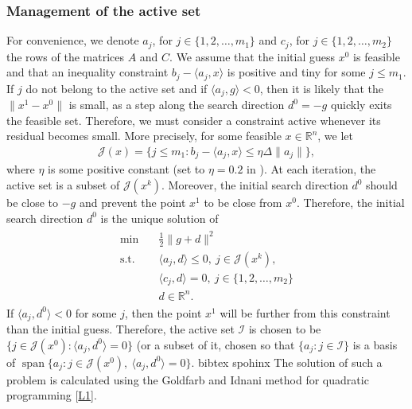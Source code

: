 \documentclass[letterpaper,10pt,english]{sphinxmanual}
\DeclareMathOperator{\vspan}{span}
\newcommand{\norm}[2][]{#1\lVert#2#1\rVert}
\newcommand{\set}[2][]{#1\{#2#1\}}
\newcommand{\inner}[2][]{#1\langle#2#1\rangle}
\def\R{\ensuremath{\mathds{R}}}
\begin{document}
\subsubsection{Management of the active set}
\label{\detokenize{algo/linalg.lctcg:management-of-the-active-set}}
\sphinxAtStartPar
For convenience, we denote
\(a_j\), for \(j \in \set{1, 2, \dots, m_1}\) and
\(c_j\), for \(j \in \set{1, 2, \dots, m_2}\) the rows of the matrices
\(A\) and \(C\). We assume that the initial guess \(x^0\) is
feasible and that an inequality constraint \(b_j - \inner{a_j, x}\) is
positive and tiny for some \(j \le m_1\). If \(j\) do not belong to the
active set and if \(\inner{a_j, g} < 0\), then it is likely that the
\(\norm{x^1 - x^0}\) is small, as a step along the search direction
\(d^0 = -g\) quickly exits the feasible set. Therefore, we must consider a
constraint active whenever its residual becomes small. More precisely, for some
feasible \(x \in \R^n\), we let
\begin{equation*}
\begin{split}\mathcal{J}(x) = \set[\big]{j \le m_1 : b_j - \inner{a_j, x} \le \eta \Delta \norm{a_j}},\end{split}
\end{equation*}
\sphinxAtStartPar
where \(\eta\) is some positive constant
(set to \(\eta = 0.2\) in ). At each iteration, the active set is a
subset of \(\mathcal{J}(x^k)\). Moreover, the initial search direction
\(d^0\) should be close to \(-g\) and prevent the point \(x^1\) to
be close from \(x^0\). Therefore, the initial search direction \(d^0\)
is the unique solution of
\begin{equation*}
\begin{split}\begin{array}{ll}
    \min        & \quad \frac{1}{2} \norm{g + d}^2\\
    \text{s.t.} & \quad \inner{a_j, d} \le 0, ~ j \in \mathcal{J}(x^k),\\
                & \quad \inner{c_j, d} = 0, ~ j \in \set{1, 2, \dots, m_2}\\
                & \quad d \in \R^n.
\end{array}\end{split}
\end{equation*}
\sphinxAtStartPar
If \(\inner{a_j, d^0} < 0\) for some \(j\), then the point \(x^1\)
will be further from this constraint than the initial guess. Therefore, the
active set \(\mathcal{I}\) is chosen to be
\(\set{j \in \mathcal{J}(x^0) : \inner{a_j, d^0} = 0}\) (or a subset of it,
chosen so that \(\set{a_j : j \in \mathcal{I}}\) is a basis of
\(\vspan \set{a_j : j \in \mathcal{J}(x^0), ~ \inner{a_j, d^0} = 0}\).
bibtex spohinx
The solution of such a problem is calculated using the Goldfarb and Idnani
method for quadratic programming {[}\hyperlink{cite.algo/linalg.lctcg:cite-1-lctcg-goldfarb-idnani-1983}{L1}{]}.
\end{document}
